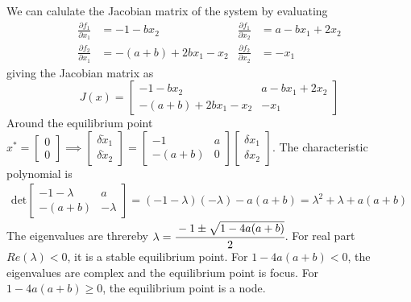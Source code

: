 We can calulate the Jacobian matrix of the system by evaluating
\begin{align*}
    \frac{\partial f_1}{\partial x_1}
     & =
    -1 - b x_2
     &
    \frac{\partial f_1}{\partial x_2}
     & =
    a - b x_1 + 2 x_2
    \\
    \frac{\partial f_2}{\partial x_1}
     & =
    -(a + b) + 2 b x_1 - x_2
     &
    \frac{\partial f_2}{\partial x_2}
     & =
    -x_1
\end{align*}
giving the Jacobian matrix as
\begin{equation*}
    J(x) =
    \begin{bmatrix}
        -1 - b x_2               & a - b x_1 + 2 x_2 \\
        -(a + b) + 2 b x_1 - x_2 & -x_1
    \end{bmatrix}
\end{equation*}
Around the equilibrium point \( x^* = \begin{bmatrix} 0 \\ 0 \end{bmatrix} \implies
\begin{bmatrix} \delta \dot x_1 \\ \delta \dot x_2 \end{bmatrix}
=
\begin{bmatrix}
    -1     & a \\
    -(a+b) & 0
\end{bmatrix}
\begin{bmatrix} \delta x_1 \\ \delta x_2 \end{bmatrix}\).
The characteristic polynomial is
\begin{align*}
    \text{det}
    \begin{bmatrix}
        -1 - \lambda & a        \\
        -(a + b)     & -\lambda
    \end{bmatrix}
    =
    (-1 - \lambda)(-\lambda) - a(a + b)
    =
    \lambda^2 + \lambda + a(a + b)
\end{align*}
The eigenvalues are threreby \( \lambda = \cfrac{-1 \pm \sqrt{1 - 4a(a + b)}}{2} \).
For real part \(Re(\lambda)< 0\), it is a stable equilibrium point.
For \( 1 - 4a(a + b) < 0 \), the eigenvalues are complex and the equilibrium point is focus.
For \( 1 - 4a(a + b) \geq 0 \), the equilibrium point is a node.

